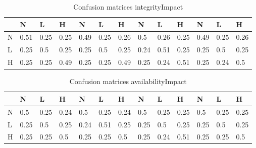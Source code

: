 \documentclass[11pt]{article}
\begin{document}
\begin{table}
	\caption{Confusion matrices integrityImpact}
	\label{table:mitre-integrityImpact}
	\begin{center}
		\begin{tabular}{l|l|l|l|l|l|l|l|l|l|l|l|l}\textbf{} & \textbf{N} & \textbf{L} & \textbf{H} & \textbf{N} & \textbf{L} & \textbf{H} & \textbf{N} & \textbf{L} & \textbf{H} & \textbf{N} & \textbf{L} & \textbf{H} \\
               \hline
               N                                    & 0.51       & 0.25       & 0.25       & 0.49       & 0.25       & 0.26       & 0.5        & 0.26       & 0.25       & 0.49       & 0.25       & 0.26       \\
               L                                    & 0.25       & 0.5        & 0.25       & 0.25       & 0.5        & 0.25       & 0.24       & 0.51       & 0.25       & 0.25       & 0.5        & 0.25       \\
               H                                    & 0.25       & 0.25       & 0.49       & 0.25       & 0.25       & 0.49       & 0.25       & 0.24       & 0.51       & 0.25       & 0.24       & 0.5        \\
		\end{tabular}
	\end{center}
\end{table}


\begin{table}
	\caption{Confusion matrices availabilityImpact}
	\label{table:mitre-availabilityImpact}
	\begin{center}
		\begin{tabular}{l|l|l|l|l|l|l|l|l|l|l|l|l}\textbf{} & \textbf{N} & \textbf{L} & \textbf{H} & \textbf{N} & \textbf{L} & \textbf{H} & \textbf{N} & \textbf{L} & \textbf{H} & \textbf{N} & \textbf{L} & \textbf{H} \\
               \hline
               N                                    & 0.5        & 0.25       & 0.24       & 0.5        & 0.25       & 0.24       & 0.5        & 0.25       & 0.25       & 0.5        & 0.25       & 0.25       \\
               L                                    & 0.25       & 0.5        & 0.25       & 0.24       & 0.51       & 0.25       & 0.25       & 0.5        & 0.25       & 0.25       & 0.5        & 0.25       \\
               H                                    & 0.25       & 0.25       & 0.5        & 0.25       & 0.25       & 0.5        & 0.25       & 0.24       & 0.51       & 0.25       & 0.25       & 0.5        \\
		\end{tabular}
	\end{center}
\end{table}
\end{document}

